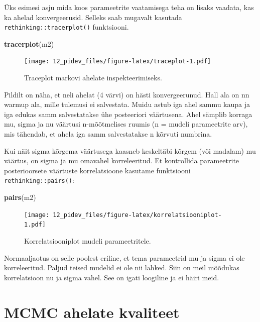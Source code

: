 \documentclass[]{book}
\newenvironment{Shaded}{\begin{snugshade}}{\end{snugshade}}
\newcommand{\KeywordTok}[1]{\textcolor[rgb]{0.13,0.29,0.53}{\textbf{#1}}}
\newcommand{\NormalTok}[1]{#1}
\begin{document}
Üks esimesi asju mida koos parameetrite vaatamisega teha on lisaks
vaadata, kas ka ahelad konvergeerusid. Selleks saab mugavalt kasutada
\texttt{rethinking::tracerplot()} funktsiooni.



\begin{Shaded}
\begin{Highlighting}[]
\KeywordTok{tracerplot}\NormalTok{(m2)}
\end{Highlighting}
\end{Shaded}

\begin{figure}
\centering
\texttt{[image: 12\_pidev\_files/figure-latex/traceplot-1.pdf]}
\caption{\label{fig:traceplot}Traceplot markovi ahelate inspekteerimiseks.}
\end{figure}

Pildilt on näha, et neli ahelat (4 värvi) on hästi konvergeerunud. Hall
ala on nn warmup ala, mille tulemusi ei salvestata. Muidu astub iga ahel
sammu kaupa ja iga edukas samm salvestatakse ühe posteeriori väärtusena.
Ahel sämplib korraga mu, sigma ja nu väärtusi n-mõõtmelises ruumis (n =
mudeli parameetrite arv), mis tähendab, et ahela iga samm salvestatakse
n kõrvuti numbrina.

Kui näit sigma kõrgema väärtusega kaasneb keskeltäbi kõrgem (või
madalam) mu väärtus, on sigma ja mu omavahel korreleeritud. Et
kontrollida parameetrite posterioorsete väärtuste korrelatsioone
kasutame funktsiooni \texttt{rethinking::pairs()}:



\begin{Shaded}
\begin{Highlighting}[]
\KeywordTok{pairs}\NormalTok{(m2)}
\end{Highlighting}
\end{Shaded}

\begin{figure}
\centering
\texttt{[image: 12\_pidev\_files/figure-latex/korrelatsiooniplot-1.pdf]}
\caption{\label{fig:korrelatsiooniplot}Korrelatsiooniplot mudeli parameetritele.}
\end{figure}

Normaaljaotus on selle poolest eriline, et tema parameetrid mu ja sigma
ei ole korreleeritud. Paljud teised mudelid ei ole nii lahked. Siin on
meil mõõdukas korrelatsioon nu ja sigma vahel. See on igati loogiline ja
ei häiri meid.

\section*{MCMC ahelate kvaliteet}\label{mcmc-ahelate-kvaliteet}
\end{document}
